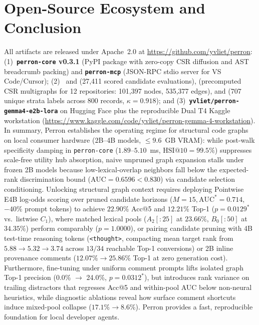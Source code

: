 \documentclass[10pt]{article}
\begin{document}
\section{Open-Source Ecosystem and Conclusion}
\label{sec:conclusion}
All artifacts are released under Apache~2.0 at \url{https://github.com/yvliet/perron}: (1)~\textbf{\texttt{perron-core} v0.3.1} (PyPI package with zero-copy CSR diffusion and AST breadcrumb packing) and \textbf{\texttt{perron-mcp}} (JSON-RPC stdio server for VS Code/Cursor); (2)~\textbf{} and \textbf{} (27,411 scored candidate evaluations), \textbf{} (precomputed CSR multigraphs for 12 repositories: 101,397 nodes, 535,377 edges), and \textbf{} (707 unique strata labels across 800 records, $\kappa=0.918$); and (3)~\textbf{\texttt{yvliet/\allowbreak perron\allowbreak -gemma4\allowbreak -e2b\allowbreak -lora}} on Hugging Face plus the reproducible Dual T4 Kaggle workstation (\url{https://www.kaggle.com/code/yvliet/perron-gemma-4-workstation}).
In summary, Perron establishes the operating regime for structural code graphs on local consumer hardware (2B--4B models, $\le 9.6$~GB VRAM): while post-walk specificity damping in \texttt{perron-core} ($1.89\text{--}5.10$~ms, $\text{HSI@10}=99.5\%$) suppresses scale-free utility hub absorption, naive unpruned graph expansion stalls under frozen 2B models because low-lexical-overlap neighbors fall below the expected-rank discrimination bound ($\text{AUC}=0.6596 < 0.830$) via candidate selection conditioning. Unlocking structural graph context requires deploying Pointwise E4B log-odds scoring over pruned candidate horizons ($M=15, \text{AUC}^* = 0.714$, $-40\%$ prompt tokens) to achieve $22.90\%$ Acc@5 and $12.21\%$ Top-1 ($p=0.0129^*$ vs.\ listwise $C_1$), where matched lexical pools ($A_2[:25]$ at $23.66\%$, $B_0[:50]$ at $34.35\%$) perform comparably ($p=1.0000$), or pairing candidate pruning with 4B test-time reasoning tokens (\texttt{<thought>}, compacting mean target rank from $5.88 \to 5.32 \to 3.74$ across $13/34$ reachable Top-1 conversions) or 2B inline provenance comments ($12.07\% \to 25.86\%$ Top-1 at zero generation cost). Furthermore, fine-tuning under uniform comment prompts lifts isolated graph Top-1 precision (0.0\% $\to$ 24.0\%, $p=0.0312^*$), but introduces rank variance on trailing distractors that regresses Acc@5 and within-pool AUC below non-neural heuristics, while diagnostic ablations reveal how surface comment shortcuts induce mixed-pool collapse ($17.1\% \to 8.6\%$). Perron provides a fast, reproducible foundation for local developer agents.
\clearpage
{
\let\oldthebibliography\thebibliography
\renewcommand\thebibliography[1]{%
  \oldthebibliography{#1}%
  \scriptsize
  \setlength{\itemsep}{-1.0pt}%
  \setlength{\parsep}{0pt}%
  \setlength{\parskip}{0pt}%
}


}
\clearpage
\end{document}
